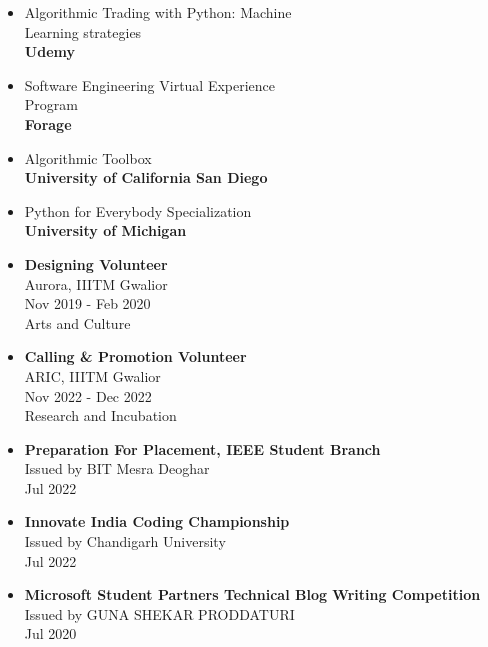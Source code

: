 \documentclass[10pt,a4paper,ragged2e,withhyper]{altacv}
\begin{document}
\begin{paracol}{2}
\begin{description}
    \end{description}

\begin{itemize}
    \item Algorithmic Trading with Python: Machine\\
        Learning strategies\\
        \textbf{Udemy}
    \item Software Engineering Virtual Experience
            \\Program \\
    \textbf{Forage}
    \item Algorithmic Toolbox \\ 
    \textbf{University of California San Diego} 
    \item Python for Everybody Specialization \\ 
    \textbf{University of Michigan}
\end{itemize}

\begin{itemize}
    \item \textbf{Designing Volunteer}\\
Aurora, IIITM Gwalior\\
Nov 2019 - Feb 2020\\
Arts and Culture\\

    \item \textbf{Calling \& Promotion Volunteer}\\
ARIC, IIITM Gwalior\\
Nov 2022 - Dec 2022\\
Research and Incubation\\

\end{itemize}
\begin{itemize}

    \item \textbf{Preparation For Placement, IEEE Student Branch}\\
Issued by BIT Mesra Deoghar\\ Jul 2022

    \item \textbf{Innovate India Coding Championship}\\
Issued by Chandigarh University \\ Jul 2022

    \item \textbf{Microsoft Student Partners Technical Blog Writing Competition}\\
Issued by GUNA SHEKAR PRODDATURI \\Jul 2020

\end{itemize}


\end{paracol}
\end{document}
